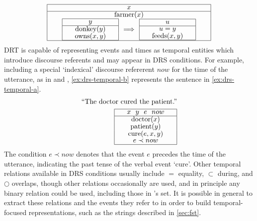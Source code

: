 \documentclass[a4paper,12pt,leqno]{article}
\def\drs#1#2{
\renewcommand{\arraystretch}{0.8}
\begin{tabular}[c]{|>{\hspace{1pc}}c<{\hspace{1pc}}|}
	\hline #1 \\
	\hline #2 \\
	\hline
\end{tabular}
\renewcommand{\arraystretch}{1}
}
\begin{document}
\begin{align}
	\drs{$x$}{farmer($x$)\\\drs{$y$}{donkey($y$)\\owns($x,y$)} $\Longrightarrow$ \drs{$u$}{$u = y$\\feeds($x,y$)}}\label{ex:donkey-2-drs}
\end{align}
DRT is capable of representing events and times as temporal entities which introduce discourse referents and may appear in DRS conditions. For example, including a special `indexical' discourse refererent $now$ for the time of the utterance, as in \citet[p. 104]{kamp1988discourse} and \citet{abzianidze2017parallel}, \cref{ex:drs-temporal-b} represents the sentence in \cref{ex:drs-temporal-a}.
\begin{subequations}
	\begin{align}
		\text{``The doctor cured the patient.''}\label{ex:drs-temporal-a}\\
		\drs{$x~~y~~e~~now$}{doctor($x$)\\patient($y$)\\cure($e,x,y$)\\$e \prec now$}\label{ex:drs-temporal-b}
	\end{align}
\end{subequations}
The condition $e \prec now$ denotes that the event $e$ precedes the time of the utterance, indicating the past tense of the verbal event `cure'. Other temporal relations available in DRS conditions usually include $=$ equality, $\subset$ during, and $\bigcirc$ overlaps, though other relations occasionally are used, and in principle any binary relation could be used, including those in \citet{allen1983maintaining}'s set. It is possible in general to extract these relations and the events they refer to in order to build temporal-focused representations, such as the strings described in \cref{sec:fst}.
\end{document}
